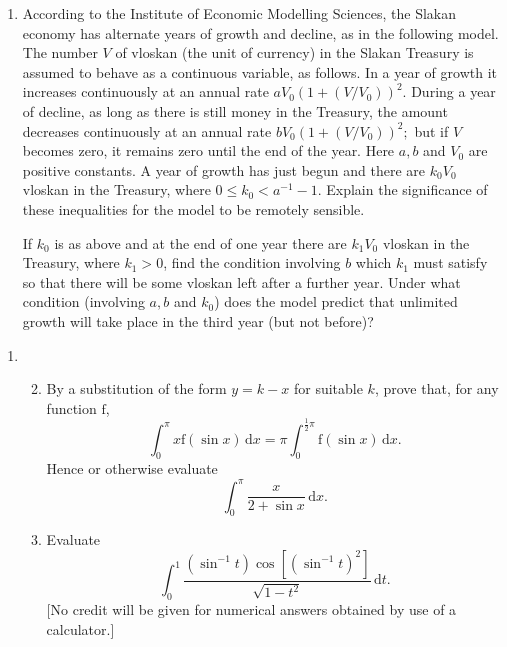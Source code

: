 \documentclass[a4, 11pt]{report}
\newlength{\qspace}
\newcounter{qnumber}
\newenvironment{question}%
 {\vspace{\qspace}
  \begin{enumerate}[\bfseries 1\quad][10]%
    \setcounter{enumi}{\value{qnumber}}%
    \item%
 }
{
  \end{enumerate}
  \filbreak
  \stepcounter{qnumber}
 }
\newenvironment{questionparts}[1][1]%
 {
  \begin{enumerate}[\bfseries (i)]%
    \setcounter{enumii}{#1}
    \addtocounter{enumii}{-1}
    \setlength{\itemsep}{5mm}
    \setlength{\parskip}{8pt}
 }
 {
  \end{enumerate}
 }
\begin{document}
\begin{question}
According to the Institute of Economic Modelling Sciences, the Slakan
economy has alternate years of growth and decline, as in the following
model. The number $V$ of vloskan (the unit of currency) in the Slakan
Treasury is assumed to behave as a continuous variable, as follows.
In a year of growth it increases continuously at an annual rate $aV_{0}\left(1+(V/V_{0})\right)^{2}.$
During a year of decline, as long as there is still money in the Treasury,
the amount decreases continuously at an annual rate $bV_{0}\left(1+(V/V_{0})\right)^{2};$
but if $V$ becomes zero, it remains zero until the end of the year.
Here $a,b$ and $V_{0}$ are positive constants. A year of growth
has just begun and there are $k_{0}V_{0}$ vloskan in the Treasury,
where $0\leqslant k_{0}<a^{-1}-1$. Explain the significance of these
inequalities for the model to be remotely sensible. 


If $k_{0}$ is as above and at the end of one year there are $k_{1}V_{0}$
vloskan in the Treasury, where $k_{1}>0$, find the condition involving
$b$ which $k_{1}$ must satisfy so that there will be some vloskan
left after a further year. Under what condition (involving $a,b$
and $k_{0}$) does the model predict that unlimited growth will take
place in the third year (but not before)?

	\end{question}
	
	\begin{question}
\begin{questionparts}
\item{By a substitution of the form $y=k-x$ for suitable $k$, prove
that, for any function $\mathrm{f}$, 
\[
\int_{0}^{\pi}x\mathrm{f}(\sin x)\,\mathrm{d}x=\pi\int_{0}^{\frac{1}{2}\pi}\mathrm{f}(\sin x)\,\mathrm{d}x.
\]
Hence or otherwise evaluate 
\[
\int_{0}^{\pi}\frac{x}{2+\sin x}\,\mathrm{d}x.
\]
}
\item{Evaluate 
\[
\int_{0}^{1}\frac{(\sin^{-1}t)\cos\left[(\sin^{-1}t)^{2}\right]}{\sqrt{1-t^{2}}}\,\mathrm{d}t.
\]
{[}No credit will be given for numerical answers obtained by use of
a calculator.{]} } \end{questionparts}
		\end{question}
		
\end{document}
